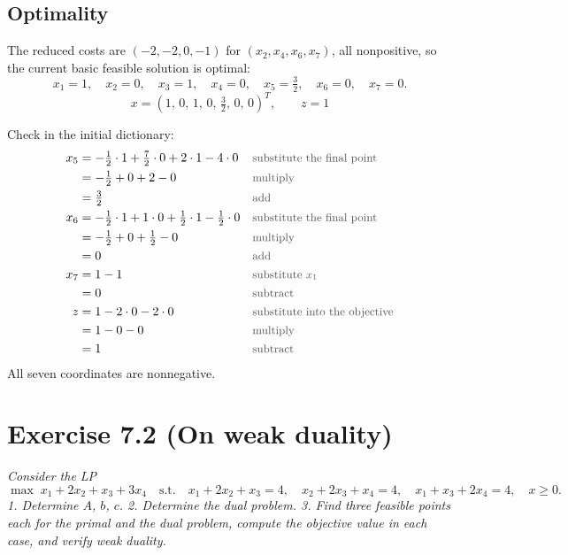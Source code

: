 \documentclass[a4paper,11pt]{article}
\newif\ifexplain
\newcommand{\aufgabe}[1]{\section*{#1}}
\newcommand{\angabe}[1]{\textit{#1}\par\smallskip}
\newcommand{\teil}[1]{\subsection*{#1}}
\newcommand{\why}[1]{\text{\small\color{black!65}#1}}
\newcommand{\explain}[1]{\ifexplain\begin{erklbox}#1\end{erklbox}\fi}
\newcommand{\explainfig}[1]{\ifexplain\begin{center}#1\end{center}\fi}
\begin{document}
\teil{Optimality}
The reduced costs are $(-2,-2,0,-1)$ for $(x_2,x_4,x_6,x_7)$, all nonpositive, so the current basic feasible solution is optimal:
\[
x_1 = 1,\quad x_2 = 0,\quad x_3 = 1,\quad x_4 = 0,\quad x_5 = \tfrac32,\quad x_6 = 0,\quad x_7 = 0 .
\]
\[
\boxed{x = (1,\,0,\,1,\,0,\,\tfrac32,\,0,\,0)^T,\qquad z = 1}
\]
\explain{Sechs degenerierte Pivots haben die Ecke $(0,0,0,0,0,0,1)$ und $z=0$ nicht verändert; erst der siebte Schritt ($x_3$ tritt ein, $x_7$ aus, Schrittweite $1$) bringt den Zielfortschritt auf $z=1$. Bland's Rule ist genau die Regel, die in so einer degenerierten Situation garantiert, dass die Basis nie zweimal dieselbe wird und der Algorithmus nicht zykelt.}
Check in the initial dictionary:
\begin{align*}
x_5 &= -\tfrac12\cdot1+\tfrac72\cdot0+2\cdot1-4\cdot0 && \why{substitute the final point}\\
&= -\tfrac12+0+2-0 && \why{multiply}\\
&= \tfrac32 && \why{add}\\
x_6 &= -\tfrac12\cdot1+1\cdot0+\tfrac12\cdot1-\tfrac12\cdot0 && \why{substitute the final point}\\
&= -\tfrac12+0+\tfrac12-0 && \why{multiply}\\
&=0 && \why{add}\\
x_7 &=1-1 && \why{substitute $x_1$}\\
&=0 && \why{subtract}\\
z &=1-2\cdot0-2\cdot0 && \why{substitute into the objective}\\
&=1-0-0 && \why{multiply}\\
&=1 && \why{subtract}
\end{align*}
All seven coordinates are nonnegative.


\explainfig{\begin{tikzpicture}[x=0.95cm,y=1cm]
\draw[->] (-0.3,0)--(8,0) node[right]{Pivot};
\draw[->] (0,-0.2)--(0,1.8) node[above]{$z$};
\draw[thick,blue] (0,0)--(6,0)--(7,1);
\foreach \x in {0,...,6}{\fill (\x,0) circle (2pt);\node[below] at (\x,0){\x};}
\fill (7,1) circle (2pt);\node[above] at (7,1){$z=1$};
\node[above] at (3,0.2){sechs Schritte mit Schrittweite null};
\end{tikzpicture}}
\aufgabe{Exercise 7.2 (On weak duality)}
\angabe{Consider the LP
\[
\max\; x_1 + 2x_2 + x_3 + 3x_4 \quad \text{s.t.}\quad
x_1 + 2x_2 + x_3 = 4,\quad x_2 + 2x_3 + x_4 = 4,\quad x_1 + x_3 + 2x_4 = 4,\quad x \ge 0.
\]
1. Determine $A$, $b$, $c$. 2. Determine the dual problem. 3. Find three feasible points each for the primal and the dual problem, compute the objective value in each case, and verify weak duality.}
\end{document}
